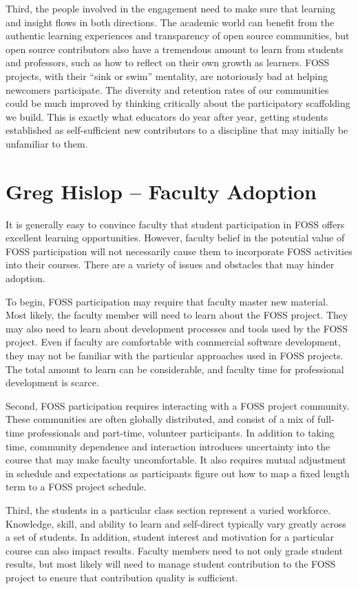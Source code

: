 \documentclass{sig-alternate}
\begin{document}
Third, the people involved in the engagement need to make sure that learning and insight flows in both directions. The academic world can benefit from the authentic learning experiences and transparency of open source communities, but open source contributors also have a tremendous amount to learn from students and professors, such as how to reflect on their own growth as learners. FOSS projects, with their ``sink or swim'' mentality, are notoriously bad at helping newcomers participate. The diversity and retention rates of our communities could be much improved by thinking critically about the participatory scaffolding we build.  This is exactly what educators do year after year, getting students established as self-sufficient new contributors to a discipline that may initially be unfamiliar to them.

\section{Greg Hislop -- Faculty Adoption}        
It is generally easy to convince faculty that student participation in FOSS offers excellent learning opportunities.  However, faculty belief in the potential value of FOSS participation will not necessarily cause them to incorporate FOSS activities into their courses.  There are a variety of issues and obstacles that may hinder adoption.

To begin, FOSS participation may require that faculty master new material.  Most likely, the faculty member will need to learn about the FOSS project.  They may also need to learn about development processes and tools used by the FOSS project.  Even if faculty are comfortable with commercial software development, they may not be familiar with the particular approaches used in FOSS projects.  The total amount to learn can be considerable, and faculty time for professional development is scarce.

Second, FOSS participation requires interacting with a FOSS project community.  These communities are often globally distributed, and consist of a mix of full-time professionals and part-time, volunteer participants.  In addition to taking time, community dependence and interaction introduces uncertainty into the course that may make faculty uncomfortable.  It also requires mutual adjustment in schedule and expectations as participants figure out how to map a fixed length term to a FOSS project schedule.

Third, the students in a particular class section represent a varied workforce.  Knowledge, skill, and ability to learn and self-direct typically vary greatly across a set of students. In addition, student interest and motivation for a particular course can also impact results.  Faculty members need to not only grade student results, but most likely will need to manage student contribution to the FOSS project to ensure that contribution quality is sufficient.
\end{document}
